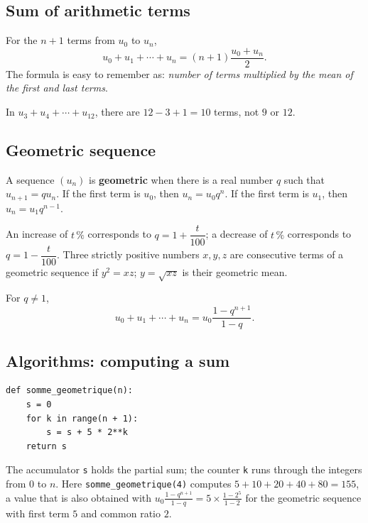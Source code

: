\subsection{Sum of arithmetic terms}
For the $n+1$ terms from $u_0$ to $u_n$,
\[
u_0+u_1+\cdots+u_n=(n+1)\frac{u_0+u_n}{2}.
\]
The formula is easy to remember as: \emph{number of terms multiplied by the mean of the first and last terms}.

\begin{pitfall}
In $u_3+u_4+\cdots+u_{12}$, there are $12-3+1=10$ terms, not $9$ or $12$.
\end{pitfall}

\subsection{Geometric sequence}
\begin{keypoint}
A sequence $(u_n)$ is \textbf{geometric} when there is a real number $q$ such that $u_{n+1}=q u_n$. If the first term is $u_0$, then $u_n=u_0q^n$. If the first term is $u_1$, then $u_n=u_1q^{n-1}$.
\end{keypoint}

\begin{center}
\end{center}

An increase of $t\,\%$ corresponds to $q=1+\dfrac{t}{100}$; a decrease of $t\,\%$ corresponds to $q=1-\dfrac{t}{100}$. Three strictly positive numbers $x,y,z$ are consecutive terms of a geometric sequence if $y^2=xz$; $y=\sqrt{xz}$ is their geometric mean.

For $q\neq1$,
\[
u_0+u_1+\cdots+u_n=u_0\frac{1-q^{n+1}}{1-q}.
\]

\subsection{Algorithms: computing a sum}
\begin{lstlisting}[style=python]
def somme_geometrique(n):
    s = 0
    for k in range(n + 1):
        s = s + 5 * 2**k
    return s
\end{lstlisting}
The accumulator \texttt{s} holds the partial sum; the counter \texttt{k} runs through the integers from $0$ to $n$. Here \texttt{somme\_geometrique(4)} computes $5+10+20+40+80=155$, a value that is also obtained with $u_0\frac{1-q^{n+1}}{1-q}=5\times\frac{1-2^5}{1-2}$ for the geometric sequence with first term $5$ and common ratio $2$.

